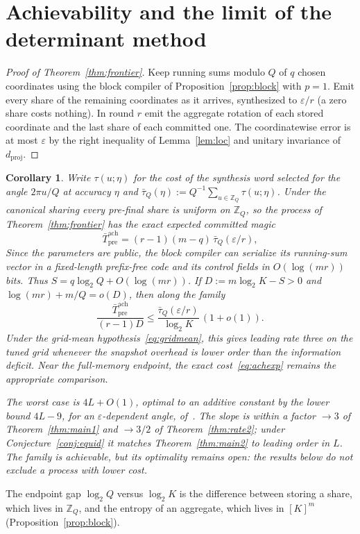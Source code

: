 \documentclass[aps,prx,twocolumn,superscriptaddress,nofootinbib,longbibliography]{revtex4-2}
\theoremstyle{plain}
\newtheorem{corollary}{Corollary}
\theoremstyle{definition}
\theoremstyle{remark}
\newcommand{\dproj}{d_{\mathrm{proj}}}
\newcommand{\Tpre}{T_{\mathrm{pre}}}
\newcommand{\Z}{\mathbb{Z}}
\begin{document}
\section{Achievability and the limit of the determinant method}\label{app:frontier}

\begin{proof}[Proof of Theorem~\ref{thm:frontier}]
Keep running sums modulo $Q$ of $q$ chosen coordinates using the block compiler of Proposition~\ref{prop:block} with $p=1$. Emit every share of the remaining coordinates as it arrives, synthesized to $\varepsilon/r$ (a zero share costs nothing). In round $r$ emit the aggregate rotation of each stored coordinate and the last share of each committed one. The coordinatewise error is at most $\varepsilon$ by the right inequality of Lemma~\ref{lem:loc} and unitary invariance of $\dproj$.
\end{proof}

\begin{corollary}\label{cor:frontier}
Write $\tau(u;\eta)$ for the cost of the synthesis word selected for the angle $2\pi u/Q$ at accuracy $\eta$ and $\bar\tau_Q(\eta):=Q^{-1}\sum_{u\in\Z_Q}\tau(u;\eta)$. Under the canonical sharing every pre-final share is uniform on $\Z_Q$, so the process of Theorem~\ref{thm:frontier} has the exact expected committed magic
\begin{equation}\label{eq:achexp}
\bar\Tpre^{\mathrm{ach}}=(r-1)(m-q)\,\bar\tau_Q(\varepsilon/r),
\end{equation}
Since the parameters are public, the block compiler can serialize its running-sum vector in a fixed-length prefix-free code and its control fields in $O(\log(mr))$ bits. Thus $S=q\log_2Q+O(\log(mr))$. If $D:=m\log_2K-S>0$ and $\log(mr)+m/Q=o(D)$, then along the family
\[
\frac{\bar\Tpre^{\mathrm{ach}}}{(r-1)D}\le\frac{\bar\tau_Q(\varepsilon/r)}{\log_2K}\,(1+o(1)).
\]
Under the grid-mean hypothesis~\eqref{eq:gridmean}, this gives leading rate three on the tuned grid whenever the snapshot overhead is lower order than the information deficit. Near the full-memory endpoint, the exact cost~\eqref{eq:achexp} remains the appropriate comparison.

The worst case is $4L+O(1)$, optimal to an additive constant by the lower bound $4L-9$, for an $\varepsilon$-dependent angle, of~\cite[Thm.~30]{Selinger15}. The slope is within a factor $\to3$ of Theorem~\ref{thm:main1} and $\to3/2$ of Theorem~\ref{thm:rate2}; under Conjecture~\ref{conj:equid} it matches Theorem~\ref{thm:main2} to leading order in $L$. The family is achievable, but its optimality remains open: the results below do not exclude a process with lower cost.
\end{corollary}
The endpoint gap $\log_2Q$ versus $\log_2K$ is the difference between storing a share, which lives in $\Z_Q$, and the entropy of an aggregate, which lives in $[K]^m$ (Proposition~\ref{prop:block}).
\end{document}
